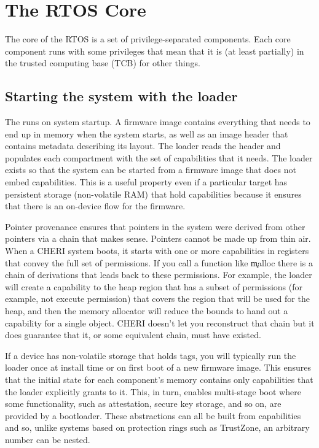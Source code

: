 \chapter{The RTOS Core}

The core of the RTOS is a set of privilege-separated components.
Each core component runs with some privileges that mean that it is (at least partially) in the trusted computing base (TCB) for other things.

\section{Starting the system with the loader}

The  runs on system startup.
A firmware image contains everything that needs to end up in memory when the system starts, as well as an image header that contains metadata describing its layout.
The loader reads the header and populates each compartment with the set of capabilities that it needs.
The loader exists so that the system can be started from a firmware image that does not embed capabilities.
This is a useful property even if a particular target has persistent storage (non-volatile RAM) that  hold capabilities because it ensures that there is an on-device  flow for the firmware.

Pointer provenance ensures that pointers in the system were derived from other pointers via a chain that makes sense.
Pointers cannot be made up from thin air.
When a CHERI system boots, it starts with one or more capabilities in registers that convey the full set of permissions.
If you call a function like \c{malloc} there is a chain of derivations that leads back to these permissions.
For example, the loader will create a capability to the heap region that has a subset of permissions (for example, not execute permission) that covers the region that will be used for the heap, and then the memory allocator will reduce the bounds to hand out a capability for a single object.
CHERI doesn't let you reconstruct that chain but it does guarantee that it, or some equivalent chain, must have existed.

If a device has non-volatile storage that holds tags, you will typically run the loader once at install time or on first boot of a new firmware image.
This ensures that the initial state for each component's memory contains only capabilities that the loader explicitly grants to it.
This, in turn, enables multi-stage boot where some functionality, such as attestation, secure key storage, and so on, are provided by a bootloader.
These abstractions can all be built from capabilities and so, unlike systems based on protection rings such as TrustZone, an arbitrary number can be nested.

